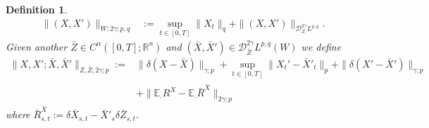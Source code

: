 \documentclass[11pt,a4paper]{article}
\newcommand{\R}{\mathbb{R}}
\newcommand{\E}{\mathbb{E}}
\newtheorem{defn}{Definition}[section]
\theoremstyle{plain}
\begin{document}
\begin{defn}
\begin{align*}
    \|(X,X')\|_{W;2\gamma;p,q} &:= \sup_{t \in [0,T]} \|X_t\|_q + \|(X,X')\|_{\mathscr{D}_Z^{2\gamma}L^{p,q}}.
\end{align*}
{ 
Given another $\bar Z \in C^\alpha([0,T];\R^n)$ and $(\bar X,\bar X') \in \mathscr{D}_{\bar Z}^{2\gamma} L^{p,q}(W)$ we define \begin{align*}
    \| X, X' ; \bar X, \bar X' \|_{Z,\bar Z; 2\gamma;p} :=&  \| \delta (X - \bar X)\|_{\gamma;p} + \sup_{t \in [0,T]} \|X_t' - \bar X'_t\|_p + \| \delta (X' - \bar X')\|_{\gamma;p} \\
    & + \| \E_\cdot R^X - \E_\cdot \bar R ^{\bar X}\|_{2\gamma ;p}
\end{align*}
where $\bar R ^{\bar X}_{s,t} := \delta \bar X_{s,t} - \bar X'_s \delta \bar Z_{s,t}$.
}
\end{defn}
\end{document}
